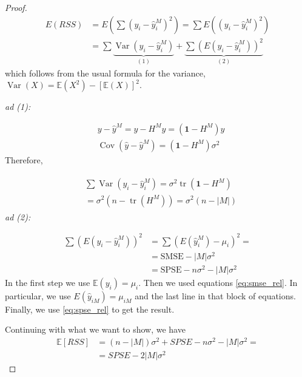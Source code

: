 \documentclass[11pt, %
	oneside, %
	english, %
	onehalfspacing, %
	]{article} %
\numberwithin{equation}{section}
\begin{document}
\begin{proof}
    $$
    \begin{aligned}
    E(R S S)&=E\left(\sum\left(y_i-\hat{y}_i^M\right)^2\right)=\sum E\left(\left(y_i-\hat{y}_i^M\right)^2\right) \\
    & = \sum \underbrace{ \operatorname{Var}\left(y_i-\hat{y}_i^M\right) }_{ (1) }+\underbrace{ \sum\left(E\left(y_i-\hat{y}_i^M\right)\right)^2 }_{ (2) }
    \end{aligned}
    $$
    which follows from the usual formula for the variance, $\operatorname{Var}(X) = \mathbb{E}(X^2) - \left[\mathbb{E} (X) \right]^2$.

    \emph{ad (1):}

    $$
    \begin{aligned}
    & y-\hat{y}^M=y-H^M y=\left(\mathbf{1}-H^M\right) y \\
    & \operatorname{Cov}\left(\hat{y}-\hat{y}^M\right)=\left(\mathbf{1}-H^M\right) \sigma^2
    \end{aligned}
    $$
    Therefore,

    $$
    \begin{aligned}
    \begin{aligned}
    & \sum \operatorname{Var}\left(y_i-\hat{y}_i^M\right)=\sigma^2 \operatorname{tr}\left(\mathbf{1}-H^M\right) \\
    &= \sigma^2\left(n-\operatorname{tr}\left(H^M\right)\right)=\sigma^2(n-|M|)
    \end{aligned}
    \end{aligned}
    $$
    \emph{ad (2):}

    $$
    \begin{aligned}
    \sum\left(E\left(y_i-\hat{y}_i^M\right)\right)^2&=\sum\left(E\left(\hat{y}_i^M\right)-\mu_i\right)^2= \\
    &=  \text {SMSE}-|M| \sigma^2 \\
    &= \text{SPSE} -n \sigma^2-|M| \sigma^2
    \end{aligned}
    $$
    In the first step we use $\mathbb{E}(y_i) = \mu_i$. Then we used equations \eqref{eq:smse_rel}. In particular, we use $E(\hat{y}_{iM}) = \mu_{iM}$ and the last line in that block of equations. Finally, we use \eqref{eq:spse_rel} to get the result.

    Continuing with what we want to show, we have
    $$
    \begin{aligned}
    \mathbb{E} \left[ RSS\right]& =(n- | M| ) \sigma^2+S P S E- n \sigma^2-|M| \sigma^2= \\
    & =S P S E-2 \left| M \right| \sigma^2
    \end{aligned}
    $$
\end{proof}
\end{document}
